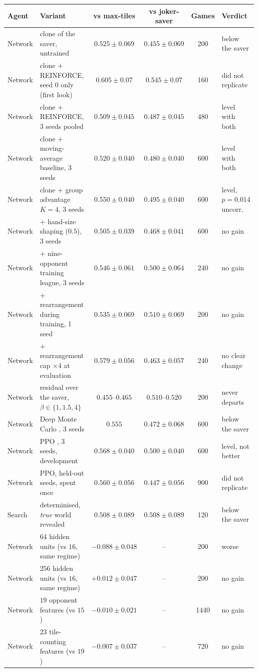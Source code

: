 \begin{tabular}{@{}llcccl@{}}\toprule
Agent & Variant & vs max-tiles & vs joker-saver & Games & Verdict\\\midrule
Network & clone of the saver, untrained & $0.525\pm0.069$ & $0.455\pm0.069$ & 200 & below the saver\\
Network & clone $+$ REINFORCE, seed 0 only (first look) & $0.605\pm0.07$ & $0.545\pm0.07$ & 160 & did not replicate\\
Network & clone $+$ REINFORCE, 3 seeds pooled & $0.509\pm0.045$ & $0.487\pm0.045$ & 480 & level with both\\
Network & clone $+$ moving-average baseline, 3 seeds & $0.520\pm0.040$ & $0.480\pm0.040$ & 600 & level with both\\
Network & clone $+$ group advantage $K{=}4$, 3 seeds & $\mathbf{0.550\pm0.040}$ & $0.495\pm0.040$ & 600 & level, $p=0.014$ uncorr.\\
Network & $+$ hand-size shaping ($0.5$), 3 seeds & $0.505\pm0.039$ & $0.468\pm0.041$ & 600 & no gain\\
Network & $+$ nine-opponent training league, 3 seeds & $0.546\pm0.061$ & $0.500\pm0.064$ & 240 & no gain\\
Network & $+$ rearrangement during training, 1 seed & $0.535\pm0.069$ & $0.510\pm0.069$ & 200 & no gain\\
Network & $+$ rearrangement cap $\times4$ at evaluation & $0.579\pm0.056$ & $0.463\pm0.057$ & 240 & no clear change\\
Network & residual over the saver, $\beta\in\{1,1.5,4\}$ & $0.455$--$0.465$ & $0.510$--$0.520$ & 200 & never departs\\
Network & Deep Monte Carlo \cite{zha2021}, 3 seeds & $0.555$ & $0.472\pm0.068$ & 600 & below the saver\\
Network & PPO \cite{schulman2017}, 3 seeds, development & $0.568\pm0.040$ & $0.500\pm0.040$ & 600 & level, not better\\
Network & PPO, held-out seeds, spent once & $0.560\pm0.056$ & $0.447\pm0.056$ & 900 & did not replicate\\
Search & determinised, \emph{true} world revealed & $0.508\pm0.089$ & $0.508\pm0.089$ & 120 & below the saver\\
Network & $64$ hidden units (vs $16$, same regime) & $-0.088\pm0.048$ & -- & 200 & worse\\
Network & $256$ hidden units (vs $16$, same regime) & $+0.012\pm0.047$ & -- & 200 & no gain\\
Network & $19$ opponent features (vs $15$) & $-0.010\pm0.021$ & -- & 1440 & no gain\\
Network & $23$ tile-counting features (vs $19$) & $-0.007\pm0.037$ & -- & 720 & no gain\\
\bottomrule\end{tabular}

